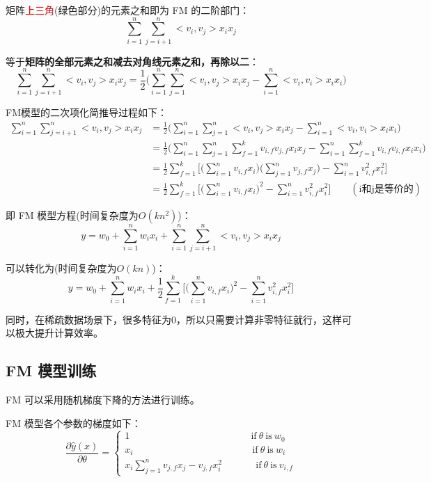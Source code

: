 \documentclass[12pt]{article}
\begin{document}
矩阵\textcolor{red}{上三角}(绿色部分)的元素之和即为 FM 的二阶部门：
$$
\sum_{i=1}^n\sum_{j=i+1}^n <v_i, v_j> x_ix_j
$$

等于\textbf{矩阵的全部元素之和减去对角线元素之和，再除以二}：
$$
\sum_{i=1}^n\sum_{j=i+1}^n <v_i, v_j> x_ix_j = \frac{1}{2}\Bigg( \sum_{i=1}^n \sum_{j=1}^n  <v_i, v_j> x_ix_j - \sum_{i=1}^n <v_i, v_i> x_ix_i \Bigg) 
$$

FM模型的二次项化简推导过程如下：
\begin{align*}
\sum_{i=1}^n\sum_{j=i+1}^n <v_i, v_j> x_ix_j &= \frac{1}{2}\Bigg( \sum_{i=1}^n \sum_{j=1}^n  <v_i, v_j> x_ix_j - \sum_{i=1}^n <v_i, v_i> x_ix_i \Bigg)  \\
&= \frac{1}{2}\Bigg( \sum_{i=1}^n \sum_{j=1}^n  \sum_{f=1}^k v_{i,f} v_{j,f} x_i x_j - \sum_{i=1}^n\sum_{f=1}^k v_{i,f} v_{i,f} x_i x_i \Bigg) \\
&= \frac{1}{2}\sum_{f=1}^k \Bigg[ \Big(\sum_{i=1}^n v_{i,f} x_i \Big) \Big(\sum_{j=1}^n v_{j,f} x_j \Big) -  \sum_{i=1}^n v_{i,f}^2 x_i^2 \Bigg] \\
&= \frac{1}{2}
\sum_{f=1}^k \Bigg[ \Big(\sum_{i=1}^n v_{i,f} x_i \Big)^2 -  \sum_{i=1}^n v_{i,f}^2 x_i^2  \Bigg] \qquad(\text{i和j是等价的})
\end{align*}

即 FM 模型方程(时间复杂度为$O(kn^2)$)：
$$
y = w_0 + \sum_{i=1}^nw_ix_i + \sum_{i=1}^n\sum_{j=i+1}^n <v_i, v_j > x_ix_j
$$

可以转化为(时间复杂度为$O(kn)$)：
$$
y = w_0 + \sum_{i=1}^nw_ix_i +  \frac{1}{2}
\sum_{f=1}^k \Bigg[ \Big(\sum_{i=1}^n v_{i,f} x_i \Big)^2 -  \sum_{i=1}^n v_{i,f}^2 x_i^2  \Bigg] 
$$

同时，在稀疏数据场景下，很多特征为0，所以只需要计算非零特征就行，这样可以极大提升计算效率。

\subsection{FM 模型训练}
FM 可以采用随机梯度下降的方法进行训练。

FM 模型各个参数的梯度如下：
$$
\frac{\partial \hat{y}(x)}{\partial \theta} = \begin{cases}
1 \ \ \qquad\qquad\qquad\qquad\qquad\qquad \text{if} \ \theta \ \text{is} \ w_0\\
x_i \ \qquad\qquad\qquad\qquad\qquad\qquad \text{if} \ \theta \ \text{is} \ w_i\\
x_i \sum_{j=1}^nv_{j,f}x_j - v_{j,f}x_i^2 \ \ \qquad\quad \text{if} \ \theta \ \text{is} \ v_{i,f}
\end{cases}
$$
\end{document}
